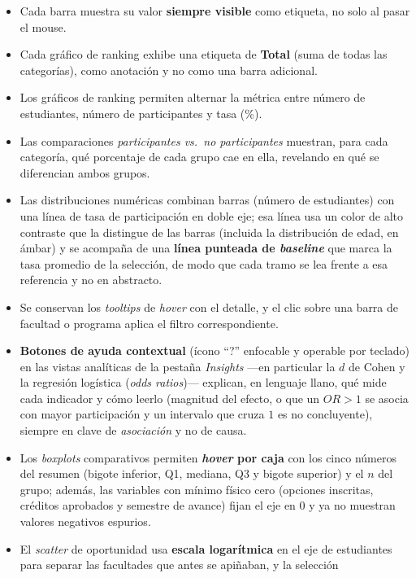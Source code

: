 \documentclass[12pt,a4paper]{article}
\begin{document}
\begin{itemize}[leftmargin=*]
    \item Cada barra muestra su valor \textbf{siempre visible} como etiqueta, no
    solo al pasar el mouse.
    \item Cada gráfico de ranking exhibe una etiqueta de \textbf{Total} (suma de
    todas las categorías), como anotación y no como una barra adicional.
    \item Los gráficos de ranking permiten alternar la métrica entre número de
    estudiantes, número de participantes y tasa (\%).
    \item Las comparaciones \emph{participantes vs.\ no participantes} muestran, para
    cada categoría, qué porcentaje de cada grupo cae en ella, revelando en qué se
    diferencian ambos grupos.
    \item Las distribuciones numéricas combinan barras (número de estudiantes) con
    una línea de tasa de participación en doble eje; esa línea usa un color de alto
    contraste que la distingue de las barras (incluida la distribución de edad, en
    ámbar) y se acompaña de una \textbf{línea punteada de \emph{baseline}} que marca
    la tasa promedio de la selección, de modo que cada tramo se lea frente a esa
    referencia y no en abstracto.
    \item Se conservan los \emph{tooltips} de \emph{hover} con el detalle, y el clic
    sobre una barra de facultad o programa aplica el filtro correspondiente.
    \item \textbf{Botones de ayuda contextual} (ícono ``?'' enfocable y operable por
    teclado) en las vistas analíticas de la pestaña \emph{Insights} ---en particular
    la $d$ de Cohen y la regresión logística (\emph{odds ratios})--- explican, en
    lenguaje llano, qué mide cada indicador y cómo leerlo (magnitud del efecto, o que
    un $OR>1$ se asocia con mayor participación y un intervalo que cruza $1$ es no
    concluyente), siempre en clave de \emph{asociación} y no de causa.
    \item Los \emph{boxplots} comparativos permiten \textbf{\emph{hover} por caja}
    con los cinco números del resumen (bigote inferior, Q1, mediana, Q3 y bigote
    superior) y el $n$ del grupo; además, las variables con mínimo físico cero
    (opciones inscritas, créditos aprobados y semestre de avance) fijan el eje en $0$
    y ya no muestran valores negativos espurios.
    \item El \emph{scatter} de oportunidad usa \textbf{escala logarítmica} en el eje
    de estudiantes para separar las facultades que antes se apiñaban, y la selección

\end{itemize}
\end{document}
